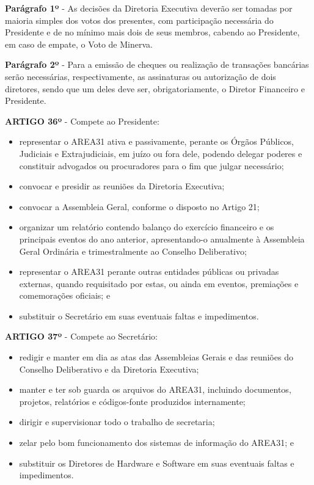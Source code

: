 \textbf{Parágrafo 1º} - As decisões da Diretoria Executiva deverão ser tomadas 
por maioria simples dos votos dos presentes, com participação necessária 
do Presidente e de no mínimo mais dois de seus membros, 
cabendo ao Presidente, em caso de empate, o Voto de Minerva.

\bigskip

\textbf{Parágrafo 2º} - Para a emissão de cheques ou realização de transações 
bancárias serão necessárias, respectivamente, as assinaturas ou autorização 
de dois diretores, sendo que um deles deve ser, obrigatoriamente, 
o  Diretor Financeiro e Presidente.

\bigskip

\textbf{ARTIGO 36º} - Compete ao Presidente:

\begin{itemize}
    \item representar o AREA31 ativa e passivamente, perante os Órgãos Públicos, Judiciais e Extrajudiciais, em juízo ou fora dele, podendo delegar poderes e constituir advogados ou procuradores para o fim que julgar necessário;
    \item convocar e presidir as reuniões da Diretoria Executiva;
    \item convocar a Assembleia Geral, conforme o disposto no Artigo 21;
    \item organizar um relatório contendo balanço do exercício financeiro e os principais eventos do ano anterior, apresentando-o anualmente à Assembleia Geral Ordinária e trimestralmente ao Conselho Deliberativo;
    \item representar o AREA31 perante outras entidades públicas ou privadas externas, quando requisitado por estas, ou ainda em eventos, premiações e comemorações oficiais; e
    \item substituir o Secretário em suas eventuais faltas e impedimentos.
\end{itemize}

\textbf{ARTIGO 37º} - Compete ao Secretário:

\begin{itemize}
    \item redigir e manter em dia as atas das Assembleias Gerais e das reuniões do Conselho Deliberativo e da Diretoria Executiva;
    \item manter e ter sob guarda os arquivos do AREA31, incluindo documentos, projetos, relatórios e códigos-fonte produzidos internamente;
    \item dirigir e supervisionar todo o trabalho de secretaria;
    \item zelar pelo bom funcionamento dos sistemas de informação do AREA31; e
    \item substituir os Diretores de Hardware e Software em suas eventuais faltas e impedimentos.
\end{itemize}

